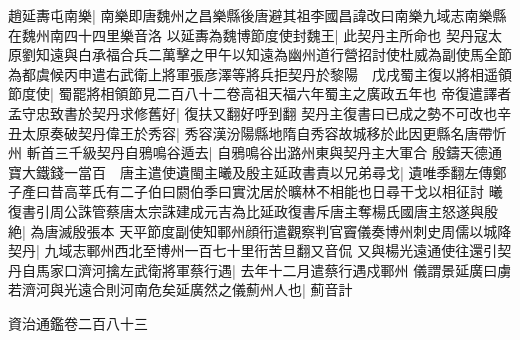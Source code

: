 趙延夀屯南樂|{
	南樂即唐魏州之昌樂縣後唐避其祖李國昌諱改曰南樂九域志南樂縣在魏州南四十四里樂音洛}
以延夀為魏博節度使封魏王|{
	此契丹主所命也}
契丹寇太原劉知遠與白承福合兵二萬擊之甲午以知遠為幽州道行營招討使杜威為副使馬全節為都虞候丙申遣右武衛上將軍張彦澤等將兵拒契丹於黎陽　戊戌蜀主復以將相遥領節度使|{
	蜀罷將相領節見二百八十二卷高祖天福六年蜀主之廣政五年也}
帝復遣譯者孟守忠致書於契丹求修舊好|{
	復扶又翻好呼到翻}
契丹主復書曰已成之勢不可改也辛丑太原奏破契丹偉王於秀容|{
	秀容漢汾陽縣地隋自秀容故城移於此因更縣名唐帶忻州}
斬首三千級契丹自鴉鳴谷遁去|{
	自鴉鳴谷出潞州東與契丹主大軍合}
殷鑄天德通寶大鐵錢一當百　唐主遣使遺閩主曦及殷主延政書責以兄弟尋戈|{
	遺唯季翻左傳鄭子產曰昔高莘氏有二子伯曰閼伯季曰實沈居於曠林不相能也日尋干戈以相征討}
曦復書引周公誅管蔡唐太宗誅建成元吉為比延政復書斥唐主奪楊氏國唐主怒遂與殷絶|{
	為唐滅殷張本}
天平節度副使知鄆州顔衎遣觀察判官竇儀奏博州刺史周儒以城降契丹|{
	九域志鄆州西北至博州一百七十里衎苦旦翻又音侃}
又與楊光遠通使往還引契丹自馬家口濟河擒左武衛將軍蔡行遇|{
	去年十二月遣蔡行遇戍鄆州}
儀謂景延廣曰虜若濟河與光遠合則河南危矣延廣然之儀薊州人也|{
	薊音計}


資治通鑑卷二百八十三
